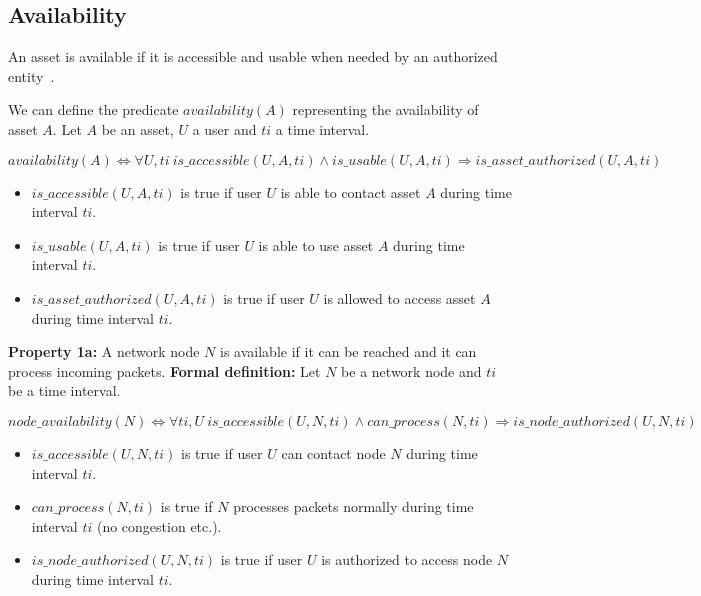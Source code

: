 \subsection{Availability}
\label{sec:prop-avail}
An asset is available if it is accessible and usable when
needed by an authorized entity~\cite{ISO/IEC270012013}.

We can define the predicate $availability(A)$ representing the availability of asset $A$.
\newline
Let $A$ be an asset, $U$ a user and $ti$ a time interval.

\begin{myformula}
$availability(A) \Leftrightarrow \forall U,ti~is\_accessible(U,A,ti) \wedge is\_usable(U,A,ti) \Rightarrow is\_asset\_authorized(U,A,ti)$
\end{myformula}

\begin{itemize}
\item $is\_accessible(U,A,ti)$ is true if user $U$ is able to contact asset $A$ during time interval $ti$.
\item $is\_usable(U,A,ti)$ is true if user $U$ is able to use asset $A$ during time interval $ti$.
\item $is\_asset\_authorized(U,A,ti)$ is true if user $U$ is allowed to access asset $A$  during time interval $ti$.
\end{itemize}

\textbf{Property 1a:} A network node $N$ is available if it can be reached and it can process incoming packets.
\newline
\textbf{Formal definition:} Let $N$ be a network node and $ti$ be a time interval.

\begin{myformula}
$node\_availability(N) \Leftrightarrow \forall ti,U~ is\_accessible(U,N,ti) \wedge can\_process(N,ti) \Rightarrow is\_node\_authorized(U,N,ti)$
\end{myformula}

\begin{itemize}
\item $is\_accessible(U,N,ti)$ is true if user $U$ can contact node $N$ during time interval $ti$.
\item $can\_process(N,ti)$ is true if $N$ processes packets normally during time interval $ti$ (\eg no congestion etc.).
\item $is\_node\_authorized(U,N,ti)$ is true if user $U$ is authorized to access node $N$ during time interval $ti$.
\end{itemize} 

